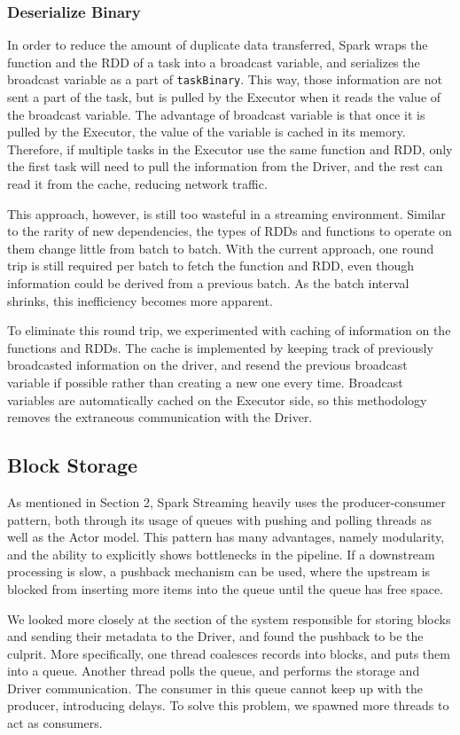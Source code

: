 \subsubsection{Deserialize Binary}
In order to reduce the amount of duplicate data transferred, Spark wraps the function and the RDD of a task into a broadcast variable, and serializes the broadcast variable as a part of \texttt{taskBinary}. This way, those information are not sent a part of the task, but is pulled by the Executor when it reads the value of the broadcast variable. The advantage of broadcast variable is that once it is pulled by the Executor, the value of the variable is cached in its memory. Therefore, if multiple tasks in the Executor use the same function and RDD, only the first task will need to pull the information from the Driver, and the rest can read it from the cache, reducing network traffic.

This approach, however, is still too wasteful in a streaming environment. Similar to the rarity of new dependencies, the types of RDDs and functions to operate on them change little from batch to batch. With the current approach, one round trip is still required per batch to fetch the function and RDD, even though information could be derived from a previous batch. As the batch interval shrinks, this inefficiency becomes more apparent.

To eliminate this round trip, we experimented with caching of information on the functions and RDDs. The cache is implemented by keeping track of previously broadcasted information on the driver, and resend the previous broadcast variable if possible rather than creating a new one every time. Broadcast variables are automatically cached on the Executor side, so this methodology removes the extraneous communication with the Driver.

\subsection{Block Storage}
As mentioned in Section 2, Spark Streaming heavily uses the producer-consumer pattern, both through its usage of queues with pushing and polling threads as well as the Actor model. This pattern has many advantages, namely modularity, and the ability to explicitly shows bottlenecks in the pipeline. If a downstream processing is slow, a pushback mechanism can be used, where the upstream is blocked from inserting more items into the queue until the queue has free space.

We looked more closely at the section of the system responsible for storing blocks and sending their metadata to the Driver, and found the pushback to be the culprit. More specifically, one thread coalesces records into blocks, and puts them into a queue. Another thread polls the queue, and performs the storage and Driver communication. The consumer in this queue cannot keep up with the producer, introducing delays. To solve this problem, we spawned more threads to act as consumers.

